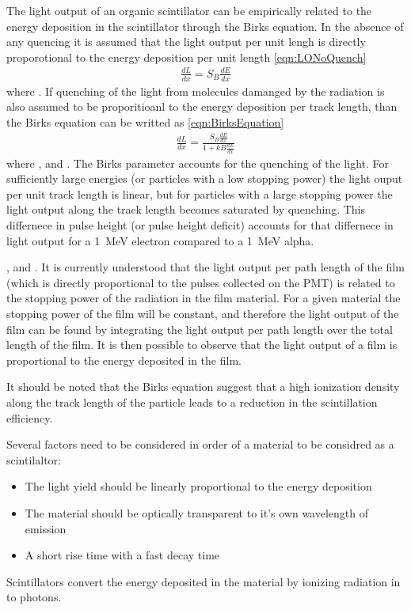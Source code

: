 The light output of an organic scintillator can be empirically related to the energy deposition in the scintillator through the Birks equation.
In the absence of any quencing it is assumed that the light output per unit lengh is directly proporotional to the energy deposition per unit length \eqref{eqn:LONoQuench}
\begin{align}
  \label{eqn:LONoQuench}
    \frac{dL}{dx} = S_B\frac{dE}{dx}
\end{align}
where .
If quenching of the light from molecules damanged by the radiation is also assumed to be proporitioanl to the energy deposition per track length, than the Birks equation can be writted as \eqref{eqn:BirksEquation}
\begin{align}
  \label{eqn:BirksEquation}
    \frac{dL}{dx} = \frac{S_B\frac{dE}{dx}}{1+kB\frac{dE}{dx}}
    \end{align}
    where , and .
The Birks parameter accounts for the quenching of the light.
For sufficiently large energies (or particles with a low stopping power) the light ouput per unit track length is linear, but for particles with a large stopping power the light output along the track length becomes saturated by quenching.
This differnece in pulse height (or pulse height deficit) accounts for that differnece in light output for a \SI{1}{\MeV} electron compared to a \SI{1}{\MeV} alpha.

, and .
It is currently understood that the light output per path length of the film (which is directly proportional to the pulses collected on the PMT) is related to the stopping power of the radiation in the film material.
    For a given material the stopping power of the film will be constant, and therefore the light output of the film can be found by integrating the light output per path length over the total length of the film.
    It is then possible to observe that the light output of a film is proportional to the energy deposited in the film.

It should be noted that the Birks equation suggest that a high ionization density along the track length of the particle leads to a reduction in the scintillation efficiency.


Several factors need to be considered in order of a material to be considred as a scintilaltor:
\begin{itemize}
  \item The light yield should be linearly proportional to the energy deposition
  \item The material should be optically transparent to it's own wavelength of emission
  \item A short rise time with a fast decay time
\end{itemize}
Scintillators convert the energy deposited in the material by ionizing radiation in to photons.


